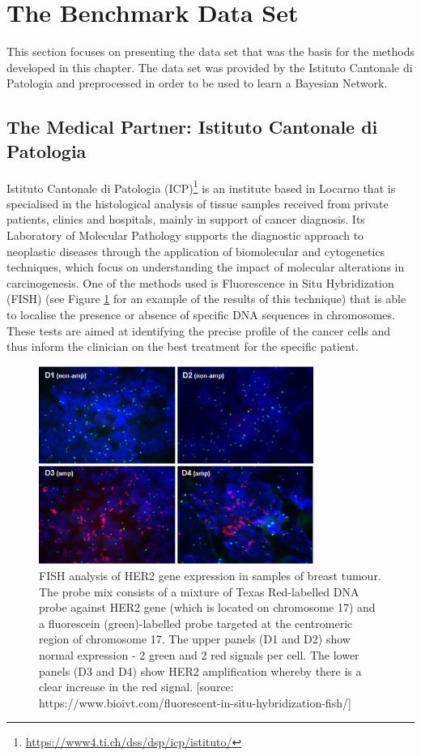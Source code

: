 \section{The Benchmark Data Set} \label{sec:data-set}
This section focuses on presenting the data set that was the basis for the methods developed in this chapter.
The data set was provided by the Istituto Cantonale di Patologia and preprocessed in order to be used to learn a Bayesian Network.

\subsection{The Medical Partner: Istituto Cantonale di Patologia} \label{subsec:istituto-cantonale}
Istituto Cantonale di Patologia (ICP)\footnote{\url{https://www4.ti.ch/dss/dsp/icp/istituto/}} is an institute based in Locarno that is specialised in the histological analysis of tissue samples received from private patients, clinics and hospitals, mainly in support of cancer diagnosis.
Its Laboratory of Molecular Pathology supports the diagnostic approach to neoplastic diseases through the application of biomolecular and cytogenetics techniques, which focus on understanding the impact of molecular alterations in carcinogenesis.
One of the methods used is Fluorescence in Situ Hybridization (FISH) (see Figure \ref{fig:fish-picture} for an example of the results of this technique) that is able to localise the presence or absence of specific DNA sequences in chromosomes.
These tests are aimed at identifying the precise profile of the cancer cells and thus inform the clinician on the best treatment for the specific patient.

\begin{figure}[htbp]
\centerline{\includegraphics[width=0.8\textwidth]{methodology/images/fish-picture}}
\caption{FISH analysis of HER2 gene expression in samples of breast tumour. The probe mix consists of a mixture of Texas Red-labelled DNA probe against HER2 gene (which is located on chromosome 17) and a fluorescein (green)-labelled probe targeted at the centromeric region of chromosome 17. The upper panels (D1 and D2) show normal expression - 2 green and 2 red signals per cell. The lower panels (D3 and D4) show HER2 amplification whereby there is a clear increase in the red signal. [source: https://www.bioivt.com/fluorescent-in-situ-hybridization-fish/]}
\label{fig:fish-picture}
\end{figure}

